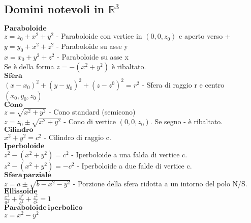 \documentclass{article} %
\begin{document}
    \subsection{Domini notevoli in $\mathbb{R}^3$}
    $\mathbf{Paraboloide}$ \\
    $z = z_0 + x^2 + y^2$ - Paraboloide con vertice in $(0,0,z_0)$ e aperto verso + \\
    $y = y_0 + x^2 + z^2$ - Paraboloide su asse y \\
    $x = x_0 + y^2 + z^2$ - Paraboloide su asse x \\
    Se è della forma $z=-(x^2 + y^2)$ è ribaltato. \\
    $\mathbf{Sfera}$ \\
    $(x-x_0)^2+(y-y_0)^2+(z-z^0)^2=r^2$ - Sfera di raggio r e centro $(x_0,y_0,z_0)$ \\
    $\mathbf{Cono}$ \\
    $z = \sqrt{x^2+y^2}$ - Cono standard (semicono)\\
    $z = z_0 \pm \sqrt{x^2+y^2}$ - Cono di vertice $(0,0,z_0)$. Se segno - è ribaltato. \\
    $\mathbf{Cilindro}$ \\
    $x^2+y^2=c^2$ - Cilindro di raggio c. \\
    $\mathbf{Iperboloide}$ \\
    $z^2-(x^2+y^2)=c^2$ - Iperboloide a una falda di vertice c. \\
    $z^2-(x^2+y^2)= - c^2$ - Iperboloide a due falde di vertice c. \\
    $\mathbf{Sfera \, parziale}$ \\
    $z= a \pm \sqrt{b-x^2-y^2}$ - Porzione della sfera ridotta a un intorno del polo N/S. \\
    $\mathbf{Ellissoide}$ \\
    $\frac{x^2}{a^2}+\frac{y^2}{b^2}+\frac{z^2}{c^2}=1$ \\
    $\mathbf{Paraboloide \, iperbolico}$ \\
    $z = x^2 - y^2$ \\
\end{document}
